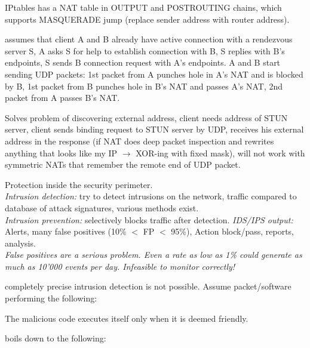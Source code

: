  IPtables has a NAT table in OUTPUT and POSTROUTING chains, which supports MASQUERADE jump (replace sender address with router address).

 assumes that client A and B already have active connection with a rendezvous server S, A asks S for help to establish connection with B, S replies with B's endpoints, S sends B connection request with A's endpoints. A and B start sending UDP packets: 1st packet from A punches hole in A's NAT and is blocked by B, 1st packet from B punches hole in B's NAT and passes A's NAT, 2nd packet from A passes B's NAT.

 Solves problem of discovering external address, client needs address of STUN server, client sends binding request to STUN server by UDP, receives his external address in the response (if NAT does deep packet inspection and rewrites anything that looks like my IP $\to$ XOR-ing with fixed mask), will not work with symmetric NATs that remember the remote end of UDP packet.

 Protection inside the security perimeter.\\
\emph{Intrusion detection:} try to detect intrusions on the network, traffic compared to database of attack signatures, various methods exist.\\
\emph{Intrusion prevention:} selectively blocks traffic after detection.
\emph{IDS/IPS output:} Alerts, many false positives (10\% $<$ FP $<$ 95\%), Action block/pass, reports, analysis.\\

\emph{False positives are a serious problem. Even a rate as low as 1\% could generate as much as 10'000 events per day. Infeasible to monitor correctly!}

 completely precise intrusion detection is not possible. Assume packet/software performing the following:

The malicious code executes itself only when it is deemed friendly.

 boils down to the following:

